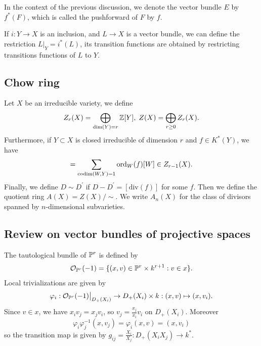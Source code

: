 \begin{notation}
    In the context of the previous discussion, we denote the vector bundle $E$ by $f^*(F)$, which is 
    called the pushforward of $F$ by $f$.
\end{notation}
If $i: Y\to X$ is an inclusion, and $L\to X$ is a vector bundle, we can define the restriction 
$L|_Y = i^*(L)$, its transition functions are obtained by restricting transitions functions of $L$ to 
$Y$.

\subsection{Chow ring}
Let $X$ be an irreducible variety, we define 
\begin{equation}
    Z_r(X) = \bigoplus_{\dim(Y) = r}\mathbb{Z}[Y],\; Z(X) =\bigoplus_{r\geq0}Z_r(X).
\end{equation}
Furthermore, if $Y\subset X$ is closed irreducible of dimension $r$ and $f\in K^*(Y)$, we have 
\begin{equation}
    [\text{div}(f)]=\sum_{\codim(W,Y)=1}\ord_W(f)[W]\in Z_{r-1}(X).
\end{equation}
Finally, we define $D\sim D^\prime$ if $D-D^\prime = [\text{div}(f)]$ for some $f$. Then we define the quotient 
ring $A(X) = Z(X)/\sim$. We write $A_n(X)$ for the class of divisors spanned by 
$n$-dimensional subvarieties.

\subsection{Review on vector bundles of projective spaces}
\begin{dang}
    \begin{definition}
        The tautological bundle of $\mathbb{P}^r$ is defined by 
        \begin{equation}
            \mathcal{O}_{\mathbb{P}^r}(-1) = \{(x,v)\in \mathbb{P}^r\times k^{r+1}: v\in x\}.
        \end{equation}
        Local trivializations are given by 
        \begin{equation}
            \varphi_i:\mathcal{O}_{\mathbb{P}^r}(-1)\big|_{D_+(X_i)}\to D_+(X_i)\times k:(x,v)\mapsto (x,v_i).
        \end{equation}
        Since $v\in x$, we have $x_iv_j = x_jv_i$, so $v_j=\tfrac{x_j}{x_i}v_i$ on $D_+(X_i)$. 
        Moreover 
        \begin{equation}
            \varphi_i\varphi_j^{-1}(x,v_j)=\varphi_i(x,v)=(x,v_i)
        \end{equation}
        so the transition map is given by $g_{ij}=\tfrac{X_i}{X_j}:D_+(X_iX_j)\to k^*$.
    \end{definition}
\end{dang}

